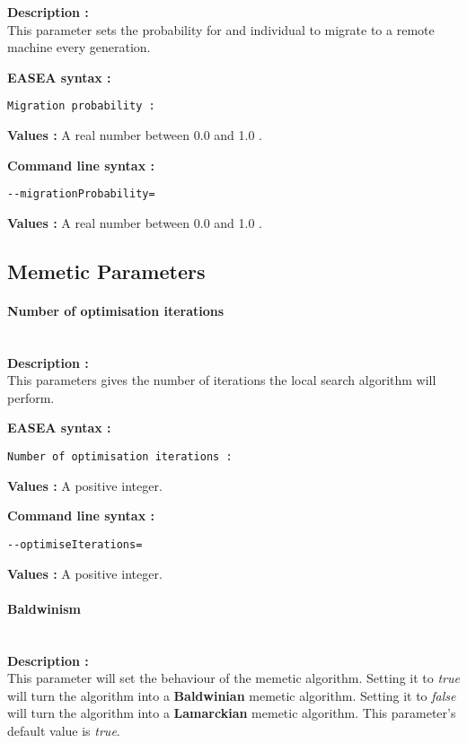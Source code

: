 \documentclass{book}
\begin{document}
\textbf{Description :}\\This parameter sets the probability for and
individual to migrate to a remote machine every generation.

\textbf{EASEA syntax :}

\texttt{Migration~probability~:}

\textbf{Values :} A real number between 0.0 and 1.0 .

\textbf{Command line syntax :}

\texttt{-{}-migrationProbability=}

\textbf{Values :} A real number between 0.0 and 1.0 .

\subsection{Memetic Parameters}\label{memetic-parameters}

\paragraph{Number of optimisation
iterations}\label{number-of-optimisation-iterations}
~\\

\textbf{Description :}\\This parameters gives the number of iterations
the local search algorithm will perform.

\textbf{EASEA syntax :}

\texttt{Number~of~optimisation~iterations~:}

\textbf{Values :} A positive integer.

\textbf{Command line syntax :}

\texttt{-{}-optimiseIterations=}

\textbf{Values :} A positive integer.

\paragraph{Baldwinism}\label{baldwinism}
~\\

\textbf{Description :}\\This parameter will set the behaviour of the
memetic algorithm. Setting it to \emph{true} will turn the algorithm
into a \textbf{Baldwinian} memetic algorithm. Setting it to \emph{false}
will turn the algorithm into a \textbf{Lamarckian} memetic algorithm.
This parameter's default value is \emph{true}.
\end{document}
